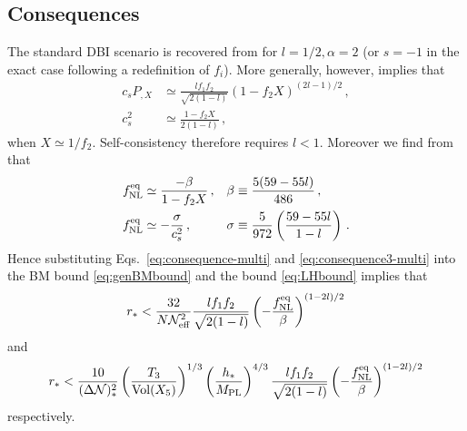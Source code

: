 



\subsection{Consequences}
\label{sec:consequences-multi}

The standard DBI scenario is recovered from  for
$l=1/2, \alpha = 2$ (or $s=-1$ in the exact case following a redefinition of
$f_i$). 
More generally, however,  implies that  
% 
\begin{align}
\label{eq:consequence-multi}
c_sP_{,X} &\simeq \frac{l f_1 f_2}{\sqrt{2(1-l)}} \left( 
1- f_2X \right)^{(2l-1)/2} \,,
\\
c_s^2 &\simeq \frac{1-f_2X}{2(1-l)} \,,
\end{align}
% 
when $X \simeq 1/f_2$. Self-consistency therefore
requires $l<1$. Moreover
we find from  that
%  
\begin{align}
\label{eq:consequence3-multi}
f_{\mathrm{NL}}^{\mathrm{eq}} &\simeq \frac{-\beta}{1-f_2X}\,, & \beta &\equiv \frac{5(59-55l)}{486}
\,,
\\
\label{eq:consequence4-multi}
f_{\mathrm{NL}}^{\mathrm{eq}} &\simeq -\frac{\sigma}{c_s^2}\,, & \sigma &\equiv 
\frac{5}{972} \left( \frac{59-55l}{1-l} \right) \,.
\end{align}
% 
Hence substituting Eqs.~\eqref{eq:consequence-multi} and
\eqref{eq:consequence3-multi} 
into the BM bound \eqref{eq:genBMbound} and the bound \eqref{eq:LHbound}
implies that
%  
\begin{equation}
\label{eq:weakBM-multi}
r_*< \frac{32}{N \mathcal{N}_\mathrm{eff}^2} \frac{l f_1 f_2}{\sqrt{2(1-l)}}
\left( -\frac{f_{\mathrm{NL}}^{\mathrm{eq}}}{\beta} \right)^{(1-2l)/2}
\end{equation}
% 
and
%  
\begin{equation}
\label{eq:weakLH-multi}
r_* < \frac{10}{(\Delta \mathcal{N})_*^2} \left( \frac{T_3}{\mathrm{Vol} (X_5)} \right)^{1/3} 
\left( \frac{h_*}{M_{\mathrm{PL}}} \right)^{4/3}
\frac{l f_1 f_2}{\sqrt{2(1-l)}}
\left( -\frac{f_{\mathrm{NL}}^{\mathrm{eq}}}{\beta} \right)^{(1-2l)/2}
\end{equation}
% 
respectively. 


